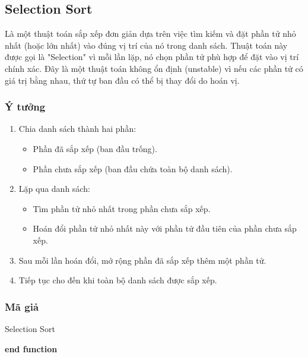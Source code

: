 \subsection{Selection Sort}

Là một thuật toán sắp xếp đơn giản dựa trên việc tìm kiếm 
và đặt phần tử nhỏ nhất (hoặc lớn nhất) vào đúng vị trí 
của nó trong danh sách. Thuật toán này được gọi là "Selection" 
vì mỗi lần lặp, nó chọn phần tử phù hợp để đặt vào vị trí 
chính xác. Đây là một thuật toán không ổn định (unstable) 
vì nếu các phần tử có giá trị bằng nhau, thứ tự ban đầu có thể 
bị thay đổi do hoán vị.

\subsubsection{Ý tưởng}

\begin{enumerate}
    \item Chia danh sách thành hai phần:
    \begin{itemize}[label=$\circ$]
        \item Phần đã sắp xếp (ban đầu trống).
        \item Phần chưa sắp xếp (ban đầu chứa toàn bộ danh sách).
    \end{itemize}
    \item Lặp qua danh sách:
    \begin{itemize}[label=$\circ$]
        \item Tìm phần tử nhỏ nhất trong phần chưa sắp xếp.
        \item Hoán đổi phần tử nhỏ nhất này với phần tử đầu tiên 
        của phần chưa sắp xếp.
    \end{itemize}
    \item Sau mỗi lần hoán đổi, mở rộng phần đã sắp xếp thêm 
    một phần tử.
    \item Tiếp tục cho đến khi toàn bộ danh sách được sắp xếp.
\end{enumerate}

\subsubsection{Mã giả}

\begin{algorithm}[H]
\caption{Selection Sort}
\textbf{end function}
\end{algorithm}

